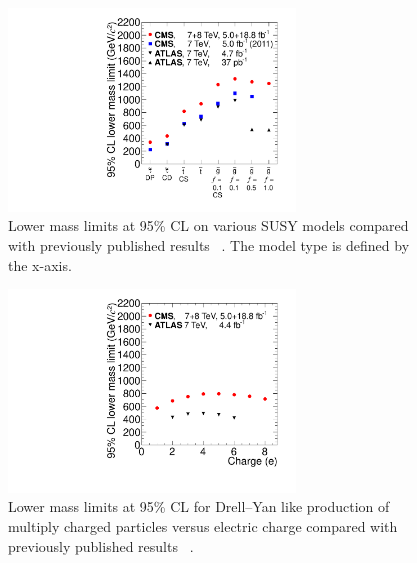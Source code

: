 \begin{figure}
 \begin{center}
  \includegraphics[clip=false, trim=0.0cm 0cm 0.0cm 0cm, width=0.68\textwidth]{figures/hscp_resultsNov2012}
 \end{center}
 \caption[Lower mass limits on HSCP produced in various SUSY models compared with previously published results]
{Lower mass limits at 95\% CL on various SUSY models compared with previously published results
~\cite{Aad:2011hz, Aad:2011yf, Aad:2011mb,Aad:2012vd, Khachatryan:2011ts, Chatrchyan:2012sp}. 
The model type is defined by the x-axis. 
}
   \label{fig:SUSYmasslimits}
\end{figure}

\begin{figure}
 \begin{center}
 \includegraphics[clip=false, trim=0.0cm 0cm 0.0cm 0cm, width=0.68\textwidth]{figures/DYhscp_resultsNov2012}
 \end{center}
 \caption[Lower mass limits on HSCP produced with various charge compared with previously published results]
{Lower mass limits at 95\% CL for Drell--Yan like production of multiply charged particles versus electric charge compared with previously published results
~\cite{Aad:2013pqd}.
}
   \label{fig:HQmasslimits}
\end{figure}
